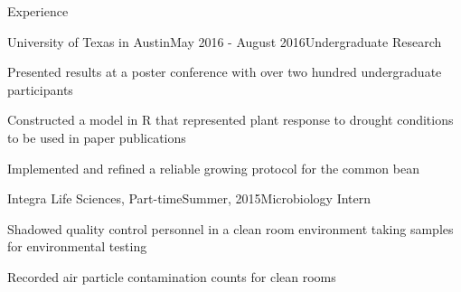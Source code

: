 \documentclass{resume} %
\begin{document}
    
    
    \begin{rSection}{Experience}
    
    \begin{rSubsection}{University of Texas in Austin}{May 2016 - August 2016}{Undergraduate Research}{}
    \item Presented results at a poster conference with over two hundred undergraduate participants
    \item Constructed a model in R that represented plant response to drought conditions to be used in paper publications
    \item Implemented and refined a reliable growing protocol for the common bean
    \end{rSubsection}

    
    \begin{rSubsection}{Integra Life Sciences, Part-time}{Summer, 2015}{Microbiology Intern}{}
    \item Shadowed quality control personnel in a clean room environment taking samples for environmental testing
    \item Recorded air particle contamination counts for clean rooms
    \end{rSubsection}
    \end{rSection}

    
    
\end{document}
